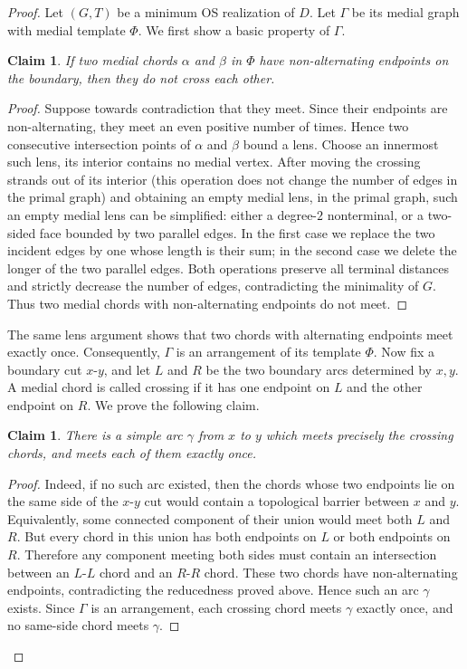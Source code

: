 \documentclass[11pt]{article}
\newtheorem{claim}[theorem]{Claim}
\begin{document}
\begin{proof}

Let $(G,T)$ be a minimum OS realization of $D$. Let $\Gamma$ be its
medial graph with medial template $\Phi$.  We first show a basic property of $\Gamma$.
\begin{claim}
If two medial chords
$\alpha$ and $\beta$ in $\Phi$ have non-alternating endpoints on the boundary, then they do not cross each other.    
\end{claim}
\begin{proof}
Suppose towards contradiction that they meet. Since their endpoints are non-alternating, they
meet an even positive number of times.  Hence two consecutive
intersection points of $\alpha$ and $\beta$ bound a lens.  Choose an
innermost such lens, its interior contains no medial vertex. After moving the crossing strands out of its interior (this operation does not change the number of edges in the primal graph) and obtaining an empty medial lens, in the
primal graph, such an empty medial lens can be simplified: either a degree-$2$ nonterminal, or a two-sided
face bounded by two parallel edges.  In the first case we replace the
two incident edges by one whose length is their sum; in the second
case we delete the longer of the two parallel edges.  Both operations
preserve all terminal distances and strictly decrease the number of
edges, contradicting the minimality of $G$.  Thus two medial chords
with non-alternating endpoints do not meet. 
\end{proof}  

The same lens argument
shows that two chords with alternating endpoints meet exactly once.
Consequently, $\Gamma$ is an arrangement of its template $\Phi$.
%
Now fix a boundary cut $x$-$y$, and let $L$ and $R$ be the two boundary
arcs determined by $x,y$.  A medial chord is called crossing if
it has one endpoint on $L$ and the other endpoint on $R$.  We prove the following claim. 
\begin{claim}
There is a simple arc $\gamma$ from $x$ to $y$ which meets precisely the
crossing chords, and meets each of them exactly once.    
\end{claim}
\begin{proof}
Indeed, if no such arc existed, then the chords whose two endpoints
lie on the same side of the $x$-$y$ cut would contain a topological
barrier between $x$ and $y$.  Equivalently, some connected component of
their union would meet both $L$ and $R$.  But every chord in this union
has both endpoints on $L$ or both endpoints on $R$.  Therefore any
component meeting both sides must contain an intersection between an
$L$-$L$ chord and an $R$-$R$ chord.  These two chords have
non-alternating endpoints, contradicting the reducedness proved above.
Hence such an arc $\gamma$ exists.  Since $\Gamma$ is an arrangement,
each crossing chord meets $\gamma$ exactly once, and no same-side
chord meets $\gamma$.
\end{proof}


\end{proof}
\end{document}
